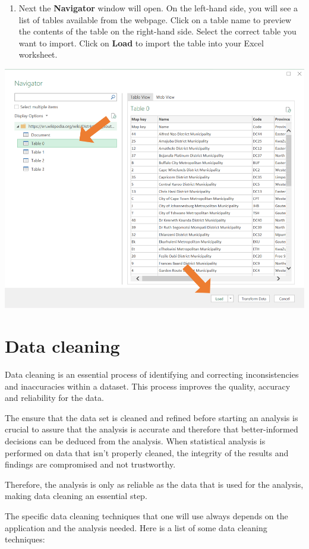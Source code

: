 \documentclass[
]{book}
\providecommand{\tightlist}{%
  \setlength{\itemsep}{0pt}\setlength{\parskip}{0pt}}
\begin{document}
\begin{enumerate}
\def\labelenumi{\arabic{enumi}.}
\setcounter{enumi}{2}
\tightlist
\item
  Next the \textbf{Navigator} window will open. On the left-hand side, you will see a list of tables available from the webpage. Click on a table name to preview the contents of the table on the right-hand side. Select the correct table you want to import. Click on \textbf{Load} to import the table into your Excel worksheet.
\end{enumerate}

\begin{center}\includegraphics[width=0.7\linewidth]{Figures/web_3} \end{center}

\chapter{Data cleaning}\label{data-cleaning}

Data cleaning is an essential process of identifying and correcting inconsistencies and inaccuracies within a dataset. This process improves the quality, accuracy and reliability for the data.

The ensure that the data set is cleaned and refined before starting an analysis is crucial to assure that the analysis is accurate and therefore that better-informed decisions can be deduced from the analysis. When statistical analysis is performed on data that isn't properly cleaned, the integrity of the results and findings are compromised and not trustworthy.

Therefore, the analysis is only as reliable as the data that is used for the analysis, making data cleaning an essential step.

The specific data cleaning techniques that one will use always depends on the application and the analysis needed. Here is a list of some data cleaning techniques:
\end{document}
